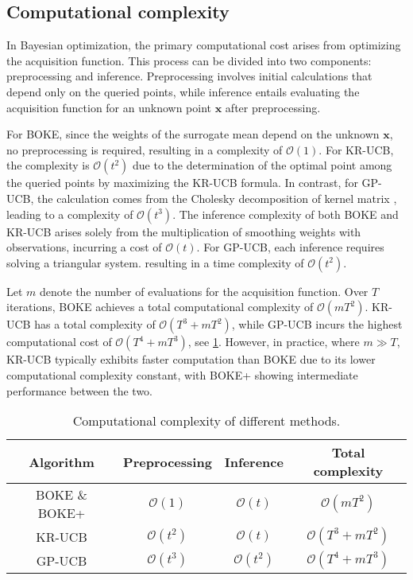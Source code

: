 \documentclass[11pt,en]{elegantpaper}
\newcommand{\x}{\bm{x}}
\newcommand{\order}{\mathcal{O}}
\newcommand{\1}{\mathds{1}}
\begin{document}
\subsection{Computational complexity}
\label{sec:computational complexity}

In Bayesian optimization, the primary computational cost arises from optimizing the acquisition function. This process can be divided into two components: preprocessing and inference. Preprocessing involves initial calculations that depend only on the queried points, while inference entails evaluating the acquisition function for an unknown point $\x$ after preprocessing.


For BOKE, since the weights of the surrogate mean depend on the unknown $\x$, no preprocessing is required, resulting in a complexity of $\order(1)$. For KR-UCB, the complexity is $\order(t^2)$ due to the determination of the optimal point among the queried points by maximizing the KR-UCB formula. In contrast, for GP-UCB, the calculation comes from the Cholesky decomposition of kernel matrix \cite{williams2006gaussian}, leading to a complexity of $\order(t^3)$.
The inference complexity of both BOKE and KR-UCB arises solely from the multiplication of smoothing weights with observations, incurring a cost of $\order(t)$. For GP-UCB, each inference requires solving a triangular system.
resulting in a time complexity of $\order(t^2)$.


Let $m$ denote the number of evaluations for the acquisition function. Over $T$ iterations, BOKE achieves a total computational complexity of $\order(mT^2)$. KR-UCB has a total complexity of $\order(T^3+mT^2)$, while GP-UCB incurs the highest computational cost of $\order(T^4+mT^3)$, see \cref{tab:computational complexity}. However, in practice, where $m \gg T$, KR-UCB typically exhibits faster computation than BOKE due to its lower computational complexity constant, with BOKE+ showing intermediate performance between the two.


\begin{table}[!htb]
    \caption{Computational complexity of different methods.}
    \label{tab:computational complexity}
    \centering
    \begin{tabular}{cccc}
        \toprule[1.5pt]
        \textbf{Algorithm} & \textbf{Preprocessing} & \textbf{Inference} & \textbf{Total complexity} \\
        \midrule[1pt]
        BOKE \& BOKE+      & $\order(1)$            & $\order(t)$        & $\order(m T^2)$           \\
        KR-UCB             & $\order(t^2)$          & $\order(t)$        & $\order(T^3 + m T^2)$     \\
        GP-UCB             & $\order(t^3)$          & $\order(t^2)$      & $\order(T^4 + m T^3)$     \\
        \bottomrule[1.5pt]
    \end{tabular}
\end{table}
\end{document}
